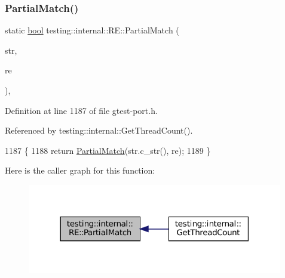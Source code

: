 \subsubsection{\texorpdfstring{Partial\+Match()}{PartialMatch()}\hspace{0.1cm}{\footnotesize\ttfamily [1/2]}}
{\footnotesize\ttfamily static \hyperlink{classbool}{bool} testing\+::internal\+::\+R\+E\+::\+Partial\+Match (\begin{DoxyParamCaption}\item[{const \+::std\+::string \&}]{str,  }\item[{const \hyperlink{classtesting_1_1internal_1_1RE}{RE} \&}]{re }\end{DoxyParamCaption})\hspace{0.3cm}{\ttfamily [inline]}, {\ttfamily [static]}}



Definition at line 1187 of file gtest-\/port.\+h.



Referenced by testing\+::internal\+::\+Get\+Thread\+Count().


\begin{DoxyCode}
1187                                                                \{
1188     \textcolor{keywordflow}{return} \hyperlink{classtesting_1_1internal_1_1RE_a1e81f9a87211bdca645e025f8f0236c8}{PartialMatch}(str.c\_str(), re);
1189   \}
\end{DoxyCode}
Here is the caller graph for this function\+:
\nopagebreak
\begin{figure}[H]
\begin{center}
\leavevmode
\includegraphics[width=316pt]{classtesting_1_1internal_1_1RE_a1e81f9a87211bdca645e025f8f0236c8_icgraph}
\end{center}
\end{figure}
\mbox{\label{classtesting_1_1internal_1_1RE_a97495dd4c2bb9589522823f060c8e8ba}} 
